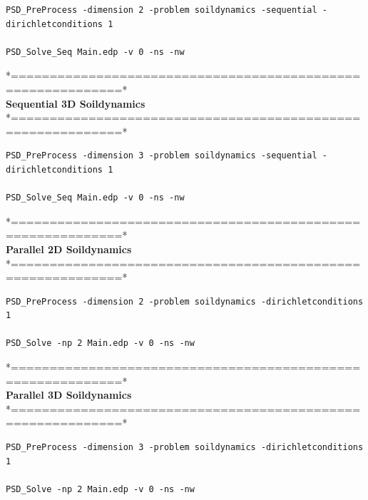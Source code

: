 \begin{lstlisting}[style=Linux]
PSD_PreProcess -dimension 2 -problem soildynamics -sequential -dirichletconditions 1  

PSD_Solve_Seq Main.edp -v 0 -ns -nw
\end{lstlisting}
*============================================================*\\
\textbf{ Sequential 3D Soildynamics  }  \\                    
*============================================================*\\

\begin{lstlisting}[style=Linux]
PSD_PreProcess -dimension 3 -problem soildynamics -sequential -dirichletconditions 1  

PSD_Solve_Seq Main.edp -v 0 -ns -nw
\end{lstlisting}
*============================================================*\\
\textbf{ Parallel 2D Soildynamics  }  \\                    
*============================================================*\\

\begin{lstlisting}[style=Linux]
PSD_PreProcess -dimension 2 -problem soildynamics -dirichletconditions 1  

PSD_Solve -np 2 Main.edp -v 0 -ns -nw
\end{lstlisting}
*============================================================*\\
\textbf{ Parallel 3D Soildynamics  }     \\                 
*============================================================*\\

\begin{lstlisting}[style=Linux]
PSD_PreProcess -dimension 3 -problem soildynamics -dirichletconditions 1  

PSD_Solve -np 2 Main.edp -v 0 -ns -nw 
\end{lstlisting}	



